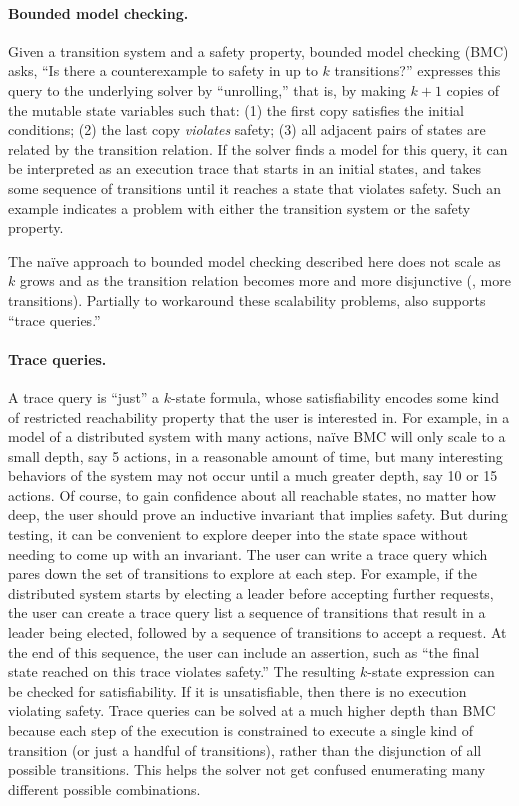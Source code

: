 \paragraph{Bounded model checking.}
Given a transition system and a safety property,
  bounded model checking (BMC) asks,
  ``Is there a counterexample to safety in up to $k$ transitions?''
\mypyvy expresses this query to the underlying solver by ``unrolling,''
  that is, by making $k+1$ copies of the mutable state variables such that:
  (1) the first copy satisfies the initial conditions;
  (2) the last copy \emph{violates} safety;
  (3) all adjacent pairs of states are related by the transition relation.
If the solver finds a model for this query,
  it can be interpreted as an execution trace
  that starts in an initial states, and takes some sequence of transitions
  until it reaches a state that violates safety.
Such an example indicates a problem with
  either the transition system or the safety property.

The na\"{i}ve approach to bounded model checking described here does not scale
  as $k$ grows and as the transition relation becomes more and more disjunctive (\ie, more transitions).
Partially to workaround these scalability problems,
  \mypyvy also supports ``trace queries.''

\paragraph{Trace queries.}
A trace query is ``just'' a $k$-state formula,
  whose satisfiability encodes some kind of restricted reachability property
  that the user is interested in.
For example, in a model of a distributed system with many actions,
  na\"{i}ve BMC will only scale to a small depth, say 5 actions,
  in a reasonable amount of time,
  but many interesting behaviors of the system may not occur until a much greater depth,
  say 10 or 15 actions.
Of course, to gain confidence about all reachable states, no matter how deep,
  the user should prove an inductive invariant that implies safety.
But during testing, it can be convenient to explore deeper into the state space
  without needing to come up with an invariant.
The user can write a trace query which pares down the set of transitions
  to explore at each step.
For example, if the distributed system starts by electing a leader
  before accepting further requests,
  the user can create a trace query list a sequence of transitions
  that result in a leader being elected,
  followed by a sequence of transitions to accept a request.
At the end of this sequence, the user can include an assertion,
  such as ``the final state reached on this trace violates safety.''
The resulting $k$-state expression can be checked for satisfiability.
If it is unsatisfiable, then there is no execution violating safety.
Trace queries can be solved at a much higher depth than BMC
  because each step of the execution is constrained to execute
  a single kind of transition (or just a handful of transitions),
  rather than the disjunction of all possible transitions.
This helps the solver not get confused
  enumerating many different possible combinations.

